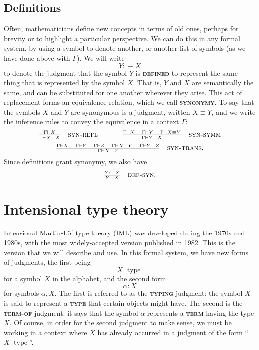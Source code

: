 \documentclass{article}
\newcommand{\defn}[1]{{\scshape\bfseries\color{MPBemph}#1}}
\newcommand{\infrule}[3]{\genfrac{}{}{}{}{#1}{#2}\hspace{1em}{\textsc{#3}}}
\DeclareMathOperator{\type}{~type}
\newcommand{\gives}{\vdash}
\newcommand{\eql}{\mathbin{:\equiv}}
\newcommand{\1}{\textbf{1}}
\newcommand{\0}{\mathbf{0}}
\newcommand{\2}{\textbf{2}}
\begin{document}
\subsection{Definitions}
Often, mathematicians define new concepts in terms of old ones, perhaps for brevity or to highlight a particular perspective. We can do this in any formal system, by using a symbol to denote another, or another list of symbols (as we have done above with \( \Gamma \)). We will write
\[ Y \eql X \]
to denote the judgment that the symbol \( Y \) is \defn{defined} to represent the same thing that is represented by the symbol \( X \). That is, \( Y \) and \( X \) are semantically the same, and can be substituted for one another wherever they arise. This act of replacement forms an equivalence relation, which we call \defn{synonymy}. To say that the symbols \( X \) and \( Y \) are synonymous is a judgment, written \( X \equiv Y \), and we write the inference rules to convey the equivalence in a context \( \Gamma \):
\[ \OD \infrule{\Gamma \gives X}{\Gamma \gives X \equiv X}{syn-refl} \hspace{35pt} \infrule{\Gamma \gives X \hspace{1em} \Gamma \gives Y \hspace{1em} \Gamma \gives X \equiv Y}{\Gamma \gives Y \equiv X}{syn-symm} \]
\[ \OD \infrule{\Gamma \gives X \hspace{1em} \Gamma \gives Y \hspace{1em} \Gamma \gives Z \hspace{1em} \Gamma \gives X \equiv Y \hspace{1em} \Gamma \gives Y \equiv Z}{\Gamma \gives X \equiv Z}{syn-trans}. \]
Since definitions grant synonymy, we also have
\[ \OD \infrule{Y \eql X}{Y \equiv X}{def-syn}. \]
\section{Intensional type theory}
Intensional Martin-L\"of type theory (IML) was developed during the 1970s and 1980s, with the most widely-accepted version published in 1982. This is the version that we will describe and use. In this formal system, we have new forms of judgments, the first being
\[ X \type \]
for a symbol \( X \) in the alphabet, and the second form
\[ \alpha : X \]
for symbols \( \alpha, X \). The first is referred to as the \defn{typing} judgment: the symbol \( X \) is said to represent a \defn{type} that certain objects might have. The second is the \defn{term-of} judgment: it says that the symbol \( \alpha \) represents a \defn{term} having the type \( X \). Of course, in order for the second judgment to make sense, we must be working in a context where \( X \) has already occurred in a judgment of the form ``\( X \type \)''.
\end{document}
